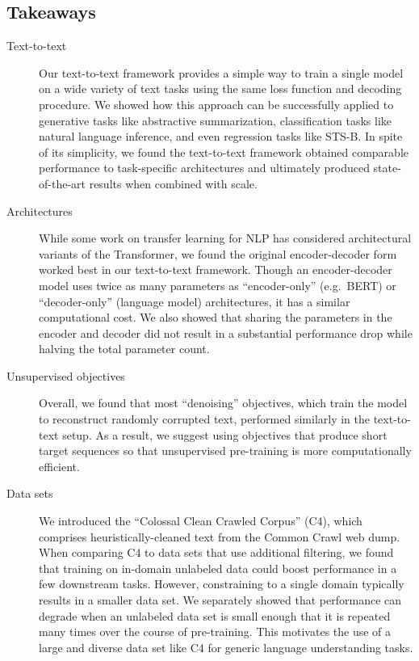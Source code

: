 \documentclass[twoside,11pt]{article}
\begin{document}
\subsection{Takeaways}

\begin{description}

\item[Text-to-text] Our text-to-text framework provides a simple way to train a single model on a wide variety of text tasks using the same loss function and decoding procedure.
We showed how this approach can be successfully applied to generative tasks like abstractive summarization, classification tasks like natural language inference, and even regression tasks like STS-B.
In spite of its simplicity, we found the text-to-text framework obtained comparable performance to task-specific architectures and ultimately produced state-of-the-art results when combined with scale.

\item[Architectures] While some work on transfer learning for NLP has considered architectural variants of the Transformer, we found the original encoder-decoder form worked best in our text-to-text framework.
Though an encoder-decoder model uses twice as many parameters as ``encoder-only'' (e.g.\ BERT) or ``decoder-only'' (language model) architectures, it has a similar computational cost.
We also showed that sharing the parameters in the encoder and decoder did not result in a substantial performance drop while halving the total parameter count.

\item[Unsupervised objectives] Overall, we found that most ``denoising'' objectives, which train the model to reconstruct randomly corrupted text, performed similarly in the text-to-text setup.
As a result, we suggest using objectives that produce short target sequences so that unsupervised pre-training is more computationally efficient.

\item[Data sets] We introduced the ``Colossal Clean Crawled Corpus'' (C4), which comprises heuristically-cleaned text from the Common Crawl web dump.
When comparing C4 to data sets that use additional filtering, we found that training on in-domain unlabeled data could boost performance in a few downstream tasks.
However, constraining to a single domain typically results in a smaller data set.
We separately showed that performance can degrade when an unlabeled data set is small enough that it is repeated many times over the course of pre-training.
This motivates the use of a large and diverse data set like C4 for generic language understanding tasks.


\end{description}
\end{document}
